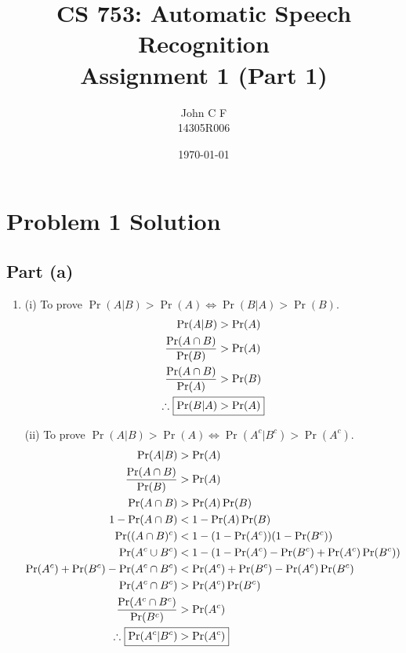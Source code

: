 \documentclass[11pt,a4paper,titlepage]{article}
\title{\blue CS 753: Automatic Speech Recognition \\ \blueb Assignment 1 (Part 1)}
\author{John C F \\ \small 14305R006}
\date{\today}
\begin{document}
\maketitle
\newpage


\section*{Problem 1 Solution}
\subsection*{Part (a)}

\addtolength{\jot}{0.25em}
\begin{enumerate}
    \item (i) To prove $\Pr(A | B) > \Pr(A) \iff \Pr(B | A) > \Pr(B)$.
        \begin{align*}
            \Pr(A | B) &> \Pr(A) \\
            \frac{\Pr(A \cap B)}{\Pr(B)} &> \Pr(A) \\
            \frac{\Pr(A \cap B)}{\Pr(A)} &> \Pr(B) \\
            \therefore~\Aboxed{\Pr(B | A) &> \Pr(A)}
        \end{align*}

        (ii) To prove $\Pr(A | B) > \Pr(A) \iff \Pr(A^c | B^c) > \Pr(A^c)$.
        \begin{align*}
            \Pr(A | B) &> \Pr(A) \\
            \frac{\Pr(A \cap B)}{\Pr(B)} &> \Pr(A) \\
            \Pr(A \cap B) &> \Pr(A) \Pr(B) \\
            1 - \Pr(A \cap B) &< 1 - \Pr(A) \Pr(B) \\
            \Pr((A \cap B)^c) &< 1 - (1 - \Pr(A^c)) (1 - \Pr(B^c)) \\
            \Pr(A^c \cup B^c) &< 1 - (1 - \Pr(A^c) - \Pr(B^c) + \Pr(A^c) \Pr(B^c)) \\
            \Pr(A^c) + \Pr(B^c) - \Pr(A^c \cap B^c) &< \Pr(A^c) + \Pr(B^c) - \Pr(A^c) \Pr(B^c) \\
            \Pr(A^c \cap B^c) &> \Pr(A^c) \Pr(B^c) \\
            \frac{\Pr(A^c \cap B^c)}{\Pr(B^c)} &> \Pr(A^c) \\
            \therefore~\Aboxed{\Pr(A^c | B^c) &> \Pr(A^c)}
        \end{align*}


\end{enumerate}
\end{document}
